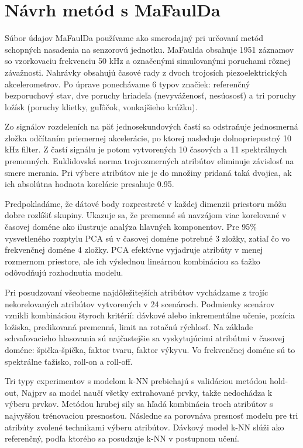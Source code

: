 \section{Návrh metód s MaFaulDa}
Súbor údajov MaFaulDa používame ako smerodajný pri určovaní metód schopných nasadenia na senzorovú jednotku. MaFaulda obsahuje 1951 záznamov so vzorkovaciu frekvenciu 50 kHz a označenými simulovanými poruchami rôznej závažnosti. Nahrávky obsahujú časové rady z dvoch trojosích piezoelektrických akcelerometrov. Po úprave ponechávame 6 typov značiek: referenčný bezporuchový stav, dve poruchy hriadeľa (nevyváženosť, nesúososť) a tri poruchy ložísk (poruchy klietky, guľôčok, vonkajšieho krúžku). 

Zo signálov rozdeleních na päť jednosekundových častí sa odstraňuje jednosmerná zložka odčítaním priemernej akcelerácie, po ktorej nasleduje dolnopriepustný 10 kHz filter. Z častí signálu je potom vytvorených 10 časových a 11 spektrálnych premenných. Euklidovská norma trojrozmerných atribútov eliminuje závislosť na smere merania. Pri výbere atribútov nie je do množiny pridaná taká dvojica, ak ich absolútna hodnota korelácie presahuje 0.95.

Predpokladáme, že dátové body rozprestreté v každej dimenzii priestoru môžu dobre rozlíšiť skupiny. Ukazuje sa, že premenné sú navzájom viac korelované v časovej doméne ako ilustruje analýza hlavných komponentov. Pre 95\% vysvetleného rozptylu PCA sú v časovej doméne potrebné 3 zložky, zatiaľ čo vo frekvenčnej doméne 4 zložky. PCA efektívne vyjadruje atribúty v menej rozmernom priestore, ale ich výslednou lineárnou kombináciou sa ťažko odôvodňujú rozhodnutia modelu.

Pri posudzovaní všeobecne najdôležitejších atribútov vychádzame z trojíc nekorelovaných atribútov vytvorených v 24 scenároch. Podmienky scenárov vznikli kombináciou štyroch kritérií: dávkové alebo inkrementálne učenie, pozícia ložiska, predikovaná premenná, limit na rotačnú rýchlosť. Na základe schvaľovacieho hlasovania sú najčastejšie sa vyskytujúcimi atribútmi v časovej doméne: špička-špička, faktor tvaru, faktor výkyvu. Vo frekvenčnej doméne sú to spektrálne ťažisko, roll-on a roll-off.

Tri typy experimentov s modelom k-NN prebiehajú s validáciou metódou hold-out, Najprv sa model naučí všetky extrahované prvky, takže nedochádza k výberu prvkov. Metódou hrubej sily sa hľadá kombinácia troch atribútov s najvyššou trénovaciou presnosťou. Následne sa porovnáva presnosť modelu pre tri atribúty zvolené technikami výberu atribútov. Dávkový model k-NN slúži ako referenčný, podľa ktorého sa posudzuje k-NN v postupnom učení.

